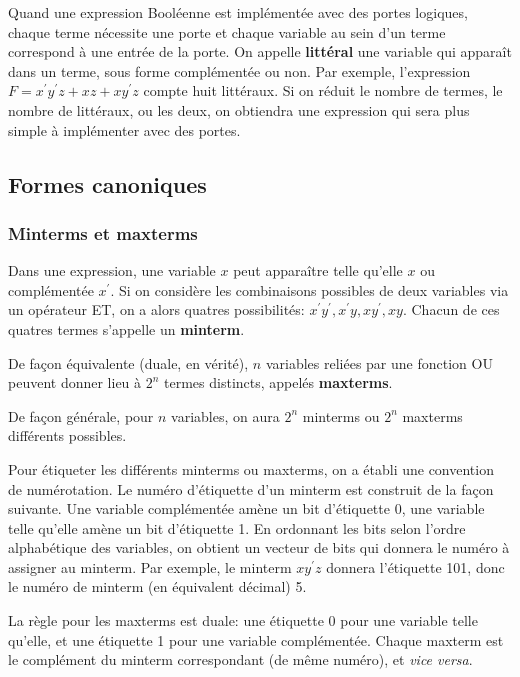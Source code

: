 \documentclass[11pt]{article}
\begin{document}
Quand une expression Booléenne est implémentée avec des portes
logiques, chaque terme nécessite une porte et chaque variable au sein
d'un terme correspond à une entrée de la porte. On appelle \textbf{littéral}
une variable qui apparaît dans un terme, sous forme complémentée ou
non. Par exemple, l'expression \(F = x^\prime y^\prime z + xz +
xy^\prime z\) compte huit littéraux. Si on réduit le nombre de
termes, le nombre de littéraux, ou les deux, on obtiendra une
expression qui sera plus simple à implémenter avec des portes.

\subsection{Formes canoniques}
\label{sec:org5a84117}

\subsubsection{Minterms et maxterms}
\label{sec:orgc2579ac}

Dans une expression, une variable \(x\) peut apparaître telle qu'elle
\(x\) ou complémentée \(x^\prime\). Si on considère les combinaisons
possibles de deux variables via un opérateur ET, on a alors quatres
possibilités: \(x^\prime y^\prime, x^\prime y, x y^\prime,x
y\). Chacun de ces quatres termes s'appelle un \textbf{minterm}.

De façon équivalente (duale, en vérité), \(n\) variables reliées par
une fonction OU peuvent donner lieu à \(2^n\) termes distincts,
appelés \textbf{maxterms}. 

De façon générale, pour \(n\) variables, on aura \(2^n\) minterms ou
\(2^n\) maxterms différents possibles.

Pour étiqueter les différents minterms ou maxterms, on a établi une
convention de numérotation. Le numéro d'étiquette d'un minterm est
construit de la façon suivante. Une variable complémentée amène un bit
d'étiquette 0, une variable telle qu'elle amène un bit d'étiquette 1.
En ordonnant les bits selon l'ordre alphabétique des variables, on
obtient un vecteur de bits qui donnera le numéro à assigner au
minterm.  Par exemple, le minterm \(x y^\prime z\) donnera l'étiquette
101, donc le numéro de minterm (en équivalent décimal) 5.

La règle pour les maxterms est duale: une étiquette 0 pour une
variable telle qu'elle, et une étiquette 1 pour une variable
complémentée. Chaque maxterm est le complément du minterm
correspondant (de même numéro), et \emph{vice versa}.
\end{document}
